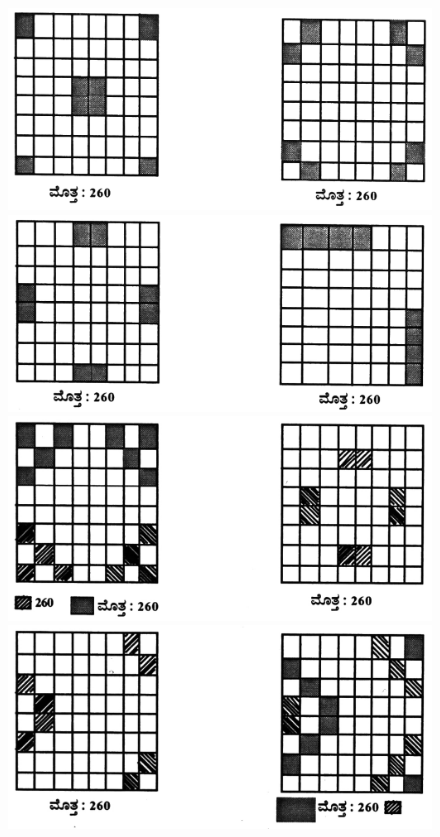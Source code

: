 \begin{figure}[H]
\includegraphics[scale=.9]{src/figures/chap7/fig7-3.jpg}\\
\includegraphics[scale=.9]{src/figures/chap7/fig7-4.jpg}\\
\includegraphics[scale=.9]{src/figures/chap7/fig7-5.jpg}\\
\includegraphics[scale=.9]{src/figures/chap7/fig7-6.jpg}
\end{figure}

